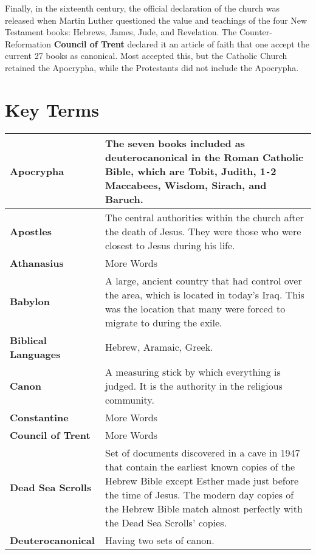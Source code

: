 \documentclass{report}
\begin{document}
        Finally, in the sixteenth century, the official declaration of the church was released when Martin Luther questioned the value and teachings of the four New Testament books: Hebrews, James, Jude, and Revelation. The Counter-Reformation \textbf{Council of Trent} declared it an article of faith that one accept the current 27 books as canonical. Most accepted this, but the Catholic Church retained the Apocrypha, while the Protestants did not include the Apocrypha.

        \section{Key Terms}
        \begin{center}
            \begin{longtable}{| p{5cm} | p{10cm} |}
            \hline
            \textbf{Apocrypha} & The seven books included as deuterocanonical in the Roman Catholic Bible, which are Tobit, Judith, 1\texttt{-}2 Maccabees, Wisdom, Sirach, and Baruch.\\ \hline
            \textbf{Apostles} & The central authorities within the church after the death of Jesus. They were those who were closest to Jesus during his life.\\ \hline
            \textbf{Athanasius} & More Words \\ \hline
            \textbf{Babylon} & A large, ancient country that had control over the area, which is located in today's Iraq. This was the location that many were forced to migrate to during the exile.\\ \hline
            \textbf{Biblical Languages} & Hebrew, Aramaic, Greek.\\ \hline
            \textbf{Canon} & A measuring stick by which everything is judged. It is the authority in the religious community.\\ \hline
            \textbf{Constantine} & More Words \\ \hline
            \textbf{Council of Trent} & More Words \\ \hline
            \textbf{Dead Sea Scrolls} & Set of documents discovered in a cave in 1947 that contain the earliest known copies of the Hebrew Bible except Esther made just before the time of Jesus. The modern day copies of the Hebrew Bible match almost perfectly with the Dead Sea Scrolls' copies.\\ \hline
            \textbf{Deuterocanonical} & Having two sets of canon.\\ \hline

\end{longtable}
\end{center}
\end{document}
